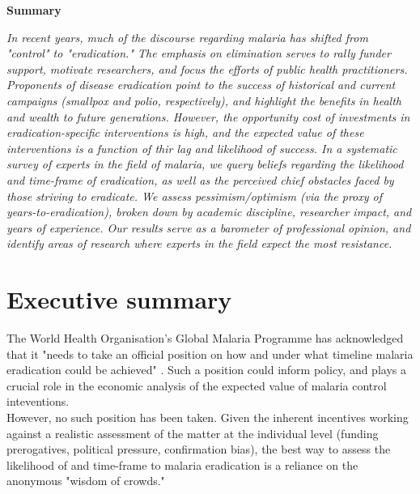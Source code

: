 \documentclass{article}
\begin{document}
\begin{changemargin}{3cm}{3cm} 

\begin{center}
\textbf{Summary}
\end{center}

\emph{In recent years, much of the discourse regarding malaria has shifted from "control" to "eradication." The emphasis on elimination serves to rally funder support, motivate researchers, and focus the efforts of public health practitioners. Proponents of disease eradication point to the success of historical and current campaigns (smallpox and polio, respectively), and highlight the benefits in health and wealth to future generations. However, the opportunity cost of investments in eradication-specific interventions is high, and the expected value of these interventions is a function of thir lag and likelihood of success. In a systematic survey of experts in the field of malaria, we query beliefs regarding the likelihood and time-frame of eradication, as well as the perceived chief obstacles faced by those striving to eradicate. We assess pessimism/optimism (via the proxy of years-to-eradication), broken down by academic discipline, researcher impact, and years of experience. Our results serve as a barometer of professional opinion, and identify areas of research where experts in the field expect the most resistance.}
\end{changemargin}
\vfill  

\newpage

\section*{Executive summary}

The World Health Organisation's Global Malaria Programme has acknowledged that it "needs to take an official position on how and under what timeline malaria eradication could be achieved" \cite{WHO2015}. Such a position could inform policy, and plays a crucial role in the economic analysis of the expected value of malaria control inteventions. \\

\noindent However, no such position has been taken. Given the inherent incentives working against a realistic assessment of the matter at the individual level (funding prerogatives, political pressure, confirmation bias), the best way to assess the likelihood of and time-frame to malaria eradication is a reliance on the anonymous "wisdom of crowds." \\
\end{document}
